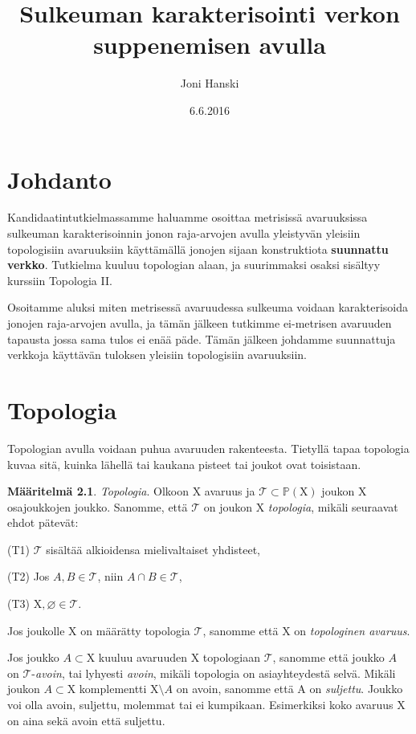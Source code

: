 \documentclass[12pt,a4paper,leqno]{report}
\title{Sulkeuman karakterisointi verkon suppenemisen avulla}
\author{Joni Hanski}
\date{6.6.2016}
\newcommand{\X}{\mathrm{X}}
\newcommand{\Pow}{\mathbb{P}}
\newcommand{\T}{\mathcal{T}}
\theoremstyle{plain}
\theoremstyle{definition}
\newtheorem{maar}[equation]{Määritelmä}
\theoremstyle{remark}
\begin{document}
\maketitle

\tableofcontents

\chapter{Johdanto}\label{johd}

Kandidaatintutkielmassamme haluamme osoittaa metrisissä avaruuksissa sulkeuman karakterisoinnin jonon raja-arvojen avulla yleistyvän yleisiin topologisiin avaruuksiin käyttämällä jonojen sijaan konstruktiota \textbf{suunnattu verkko}. Tutkielma kuuluu topologian alaan, ja suurimmaksi osaksi sisältyy kurssiin Topologia II.

Osoitamme aluksi miten metrisessä avaruudessa sulkeuma voidaan karakterisoida jonojen raja-arvojen avulla, ja tämän jälkeen tutkimme ei-metrisen avaruuden tapausta jossa sama tulos ei enää päde. Tämän jälkeen johdamme suunnattuja verkkoja käyttävän tuloksen yleisiin topologisiin avaruuksiin.

\chapter{Topologia}\label{TOP}

Topologian avulla voidaan puhua avaruuden rakenteesta. Tietyllä tapaa topologia kuvaa sitä, kuinka lähellä tai kaukana pisteet tai joukot ovat toisistaan.

\begin{maar}\label{topmaar}
\emph{Topologia}. Olkoon $\X$ avaruus ja $\T \subset \Pow(\X)$ joukon $\X$ osajoukkojen joukko. Sanomme, että $\T$ on joukon $\X$ \emph{topologia}, mikäli seuraavat ehdot pätevät:

(T1) $\T$ sisältää alkioidensa mielivaltaiset yhdisteet,

(T2) Jos $A,B \in \T$, niin $A \cap B \in \T$,

(T3) $\X, \varnothing \in \T$.
\end{maar}

Jos joukolle $\X$ on määrätty topologia $\T$, sanomme että $\X$ on \emph{topologinen avaruus}.

Jos joukko $A \subset \X$ kuuluu avaruuden $\X$ topologiaan $\T$, sanomme että joukko $A$ on $\T$-\emph{avoin}, tai lyhyesti \emph{avoin}, mikäli topologia on asiayhteydestä selvä. Mikäli joukon $A \subset \X$ komplementti $\X \setminus A$ on avoin, sanomme että A on \emph{suljettu}. Joukko voi olla avoin, suljettu, molemmat tai ei kumpikaan. Esimerkiksi koko avaruus $\X$ on aina sekä avoin että suljettu.
\end{document}
